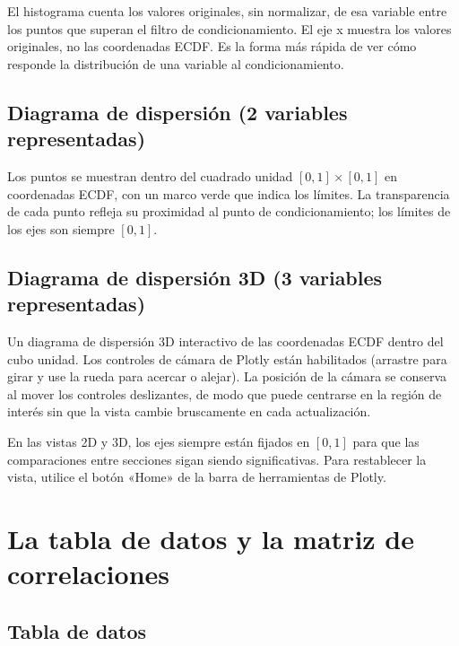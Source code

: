 \documentclass[11pt,a4paper]{article}
\begin{document}
El histograma cuenta los valores originales, sin normalizar, de esa variable entre los puntos que superan el filtro de condicionamiento. El eje x muestra los valores originales, no las coordenadas ECDF. Es la forma más rápida de ver cómo responde la distribución de una variable al condicionamiento.

\subsection{Diagrama de dispersión (2 variables representadas)}

Los puntos se muestran dentro del cuadrado unidad $[0,1]\times[0,1]$ en coordenadas ECDF, con un marco verde que indica los límites. La transparencia de cada punto refleja su proximidad al punto de condicionamiento; los límites de los ejes son siempre $[0,1]$.

\subsection{Diagrama de dispersión 3D (3 variables representadas)}

Un diagrama de dispersión 3D interactivo de las coordenadas ECDF dentro del cubo unidad. Los controles de cámara de Plotly están habilitados (arrastre para girar y use la rueda para acercar o alejar). La posición de la cámara se conserva al mover los controles deslizantes, de modo que puede centrarse en la región de interés sin que la vista cambie bruscamente en cada actualización.

\begin{notebox}
En las vistas 2D y 3D, los ejes siempre están fijados en $[0,1]$ para que las comparaciones entre secciones sigan siendo significativas. Para restablecer la vista, utilice el botón «Home» de la barra de herramientas de Plotly.
\end{notebox}

\section{La tabla de datos y la matriz de correlaciones}

\subsection{Tabla de datos}
\end{document}
